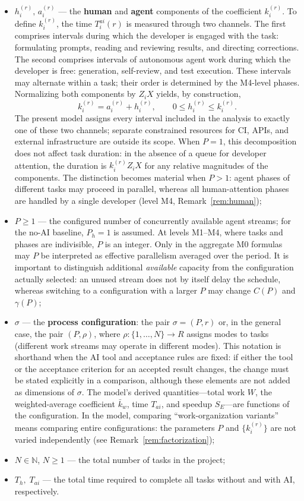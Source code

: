 \begin{definition}
\begin{itemize}
  \item $h_i^{(r)},\, a_i^{(r)}$ --- the \textbf{human} and \textbf{agent} components of the coefficient $k_i^{(r)}$. To define $k_i^{(r)}$, the time $T_i^{ai}(r)$ is measured through two channels. The first comprises intervals during which the developer is engaged with the task: formulating prompts, reading and reviewing results, and directing corrections. The second comprises intervals of autonomous agent work during which the developer is free: generation, self-review, and test execution. These intervals may alternate within a task; their order is determined by the M4-level phases. Normalizing both components by $Z_i X$ yields, by construction,
  \[
    k_i^{(r)} = a_i^{(r)} + h_i^{(r)}, \qquad 0 \le h_i^{(r)} \le k_i^{(r)}.
  \]
  The present model assigns every interval included in the analysis to exactly one of these two channels; separate constrained resources for CI, APIs, and external infrastructure are outside its scope. When $P = 1$, this decomposition does not affect task duration: in the absence of a queue for developer attention, the duration is $k_i^{(r)} Z_i X$ for any relative magnitudes of the components. The distinction becomes material when $P > 1$: agent phases of different tasks may proceed in parallel, whereas all human-attention phases are handled by a single developer (level M4, Remark~\ref{rem:human});
  \item $P \ge 1$ --- the configured number of concurrently available agent streams; for the no-AI baseline, $P_h = 1$ is assumed. At levels M1--M4, where tasks and phases are indivisible, $P$ is an integer. Only in the aggregate M0 formulas may $P$ be interpreted as effective parallelism averaged over the period. It is important to distinguish additional \emph{available} capacity from the configuration actually selected: an unused stream does not by itself delay the schedule, whereas switching to a configuration with a larger $P$ may change $C(P)$ and $\gamma(P)$;
  \item $\sigma$ --- the \textbf{process configuration}: the pair $\sigma = (P, r)$ or, in the general case, the pair $(P, \rho)$, where $\rho\colon \{1, \dots, N\} \to R$ assigns modes to tasks (different work streams may operate in different modes). This notation is shorthand when the AI tool and acceptance rules are fixed: if either the tool or the acceptance criterion for an accepted result changes, the change must be stated explicitly in a comparison, although these elements are not added as dimensions of $\sigma$. The model's derived quantities---total work $W$, the weighted-average coefficient $\bar{k}_w$, time $T_{ai}$, and speedup $S_E$---are functions of the configuration. In the model, comparing ``work-organization variants'' means comparing entire configurations: the parameters $P$ and $\{k_i^{(r)}\}$ are not varied independently (see Remark~\ref{rem:factorization});
  \item $N \in \mathbb{N}$, $N\ge1$ --- the total number of tasks in the project;
  \item $T_h,\; T_{ai}$ --- the total time required to complete all tasks without and with AI, respectively.
\end{itemize}
\end{definition}

